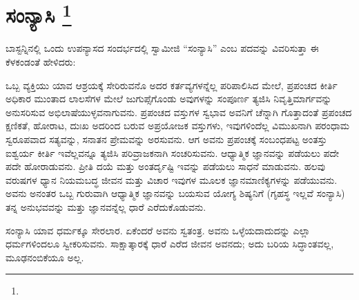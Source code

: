 
\chapter[ಸಂನ್ಯಾಸಿ ]{ಸಂನ್ಯಾಸಿ \protect\footnote{}}

ಬಾಸ್ಟನ್ನಿನಲ್ಲಿ ಒಂದು ಉಪನ್ಯಾಸದ ಸಂದರ್ಭದಲ್ಲಿ ಸ್ವಾಮೀಜಿ “ಸಂನ್ಯಾಸಿ” ಎಂಬ ಪದವನ್ನು ವಿವರಿಸುತ್ತಾ ಈ ಕೆಳಕಂಡಂತೆ ಹೇಳಿದರು:

ಒಬ್ಬ ವ್ಯಕ್ತಿಯು ಯಾವ ಆಶ್ರಯಕ್ಕೆ ಸೇರಿರುವನೊ ಅದರ ಕರ್ತವ್ಯಗಳನ್ನೆಲ್ಲ ಪರಿಪಾಲಿಸಿದ ಮೇಲೆ, ಪ್ರಪಂಚದ ಕೀರ್ತಿ ಅಧಿಕಾರ ಮುಂತಾದ ಲಾಲಸೆಗಳ ಮೇಲೆ ಜುಗುಪ್ಸೆಗೊಂಡು ಅವುಗಳನ್ನು ಸಂಪೂರ್ಣ ತ್ಯಜಿಸಿ ನಿವೃತ್ತಿಮಾರ್ಗವನ್ನು ಅನುಸರಿಸುವ ಅಭಿಲಾಷೆಯುಳ್ಳವನಾಗುವನು. ಪ್ರಪಂಚದ ವಸ್ತುಗಳ ಸ್ವಭಾವ ಅವನಿಗೆ ಚೆನ್ನಾಗಿ ಗೊತ್ತಾದಂತೆ ಪ್ರಪಂಚದ ಕ್ಷಣಿಕತೆ, ಹೋರಾಟ, ದುಃಖ ಅದರಿಂದ ಬರುವ ಅಪ್ರಯೋಜಕ ವಸ್ತುಗಳು, ಇವುಗಳಿಂದೆಲ್ಲ ವಿಮುಖನಾಗಿ ಪರಂಧಾಮ ಸ್ವರೂಪವಾದ ಸತ್ಯವನ್ನು, ಸನಾತನ ಪ್ರೇಮವನ್ನು ಅರಸುವನು. ಆಗ ಅವನು ಪ್ರಪಂಚಕ್ಕೆ ಸಂಬಂಧಪಟ್ಟ ಅಂತಸ್ತು ಐಶ್ವರ್ಯ ಕೀರ್ತಿ ಇವೆಲ್ಲವನ್ನೂ ತ್ಯಜಿಸಿ ಪರಿವ್ರಾಜಕನಾಗಿ ಸಂಚರಿಸುವನು. ಆಧ್ಯಾತ್ಮಿಕ ಜ್ಞಾನವನ್ನು ಪಡೆಯಲು ಪದೇ ಪದೇ ಹೋರಾಡುವನು. ಪ್ರೀತಿ ದಯೆ ಮತ್ತು ಅಂತರ್ದೃಷ್ಟಿ ಇವನ್ನು ಪಡೆಯಲು ಸಾಧನೆ ಮಾಡುವನು. ಹಲವು ವರುಷಗಳ ಧ್ಯಾನ ನಿಯಮಬದ್ಧ ಜೀವನ ಮತ್ತು ವಿಚಾರ ಇವುಗಳ ಮೂಲಕ ಜ್ಞಾನಮಾಣಿಕ್ಯಗಳನ್ನು ಪಡೆಯುವನು. ಅವನು ಅನಂತರ ಒಬ್ಬ ಗುರುವಾಗಿ ಆಧ್ಯಾತ್ಮಿಕ ಜ್ಞಾನವನ್ನು ಬಯಸುವ ಯೋಗ್ಯ ಶಿಷ್ಯನಿಗೆ (ಗೃಹಸ್ಥ ಇಲ್ಲವೆ ಸಂನ್ಯಾಸಿ) ತನ್ನ ಅನುಭವವನ್ನು ಮತ್ತು ಜ್ಞಾನವನ್ನೆಲ್ಲ ಧಾರೆ ಎರೆದುಕೊಡುವನು.

ಸಂನ್ಯಾಸಿ ಯಾವ ಧರ್ಮಕ್ಕೂ ಸೇರಲಾರ. ಏಕೆಂದರೆ ಅವನು ಸ್ವತಂತ್ರ. ಅವನು ಒಳ್ಳೆಯದಾದುದನ್ನು ಎಲ್ಲಾ ಧರ್ಮಗಳಿಂದಲೂ ಸ್ವೀಕರಿಸುವನು. ಸಾಕ್ಷಾತ್ಕಾರಕ್ಕೆ ಧಾರೆ ಎರೆದ ಜೀವನ ಅವನದು; ಅದು ಬರಿಯ ಸಿದ್ಧಾಂತವಲ್ಲ, ಮೂಢನಂಬಿಕೆಯೂ ಅಲ್ಲ.

